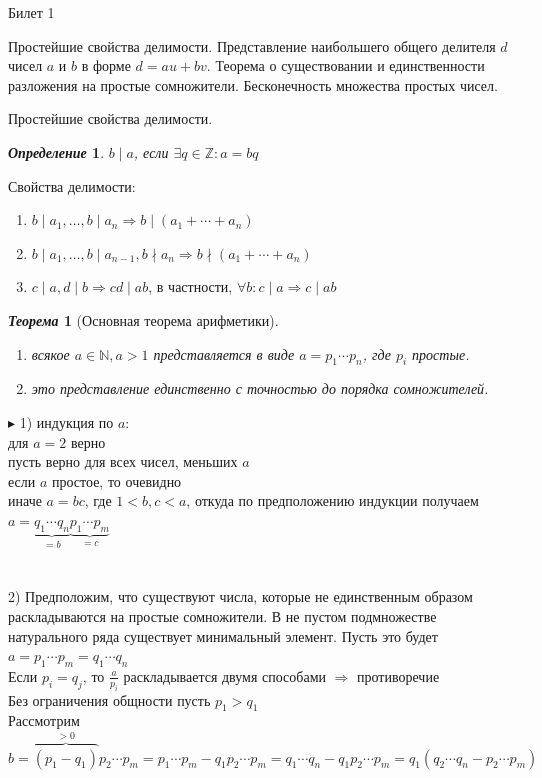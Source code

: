 \documentclass[a4paper,12pt]{article}
\newtheorem{deff}{\textit{Определение}}
\newtheorem{teo}{\textit{Теорема}}
\newcommand{\q}{\quad}
\newcommand{\pb}{\blacktriangleright}
\newcommand{\bb}[1]{\mathbb{#1}}
\begin{document}
\newpage
\begin{mybox}{\hypertarget{bil1}{Билет 1}}

\begin{formbox}{}
Простейшие свойства делимости. Представление наибольшего общего делителя $d$ чисел $a$ и $b$ в форме $d = au+bv$. Теорема о существовании и единственности разложения на простые сомножители. Бесконечность множества простых чисел.
\end{formbox}
Простейшие свойства делимости.
\begin{formbox}{}
\begin{deff} $b\mid a$, если $\exists q\in \mathbb{Z}: a=bq$
\end{deff}
\end{formbox}
Свойства делимости:
\begin{enumerate}
    \item $b\mid a_1, \dots, b\mid a_n \Rightarrow b\mid(a_1+\cdots+a_n)$
    \item $b\mid a_1, \dots, b\mid a_{n-1}, b\nmid a_n \Rightarrow b\nmid (a_1+\cdots+a_n)$
    \item $c\mid a, d\mid b \Rightarrow cd\mid ab$, в частности, $\forall b: c\mid a \Rightarrow c\mid ab$
\end{enumerate}

\begin{formbox}{}
\begin{teo}[Основная теорема арифметики]\q\\
\begin{enumerate}
    \item всякое $a \in \bb{N}, a > 1$ представляется в виде $a = p_1\cdots p_n$, где $p_i$ простые.
    \item это представление единственно с точностью до порядка сомножителей.
\end{enumerate}
\end{teo}
\end{formbox}
$\pb$ 1) индукция по $a$:\\
для $a = 2$ верно\\
пусть верно для всех чисел, меньших $a$\\
если $a$ простое, то очевидно\\
иначе $a = bc$, где $1<b,c<a$, откуда по предположению индукции получаем $a = \underbrace{q_1\cdots q_n}_{=b} \underbrace{p_1\cdots p_m}_{=c}$\\\q\\\q\\
2) Предположим, что существуют числа, которые не единственным образом раскладываются на простые сомножители. В не пустом подмножестве натурального ряда существует минимальный элемент. Пусть это будет $a = p_1\cdots p_m = q_1\cdots q_n$\\
Если $p_i = q_j$, то $\frac{a}{p_i}$ раскладывается двумя способами $\Rightarrow$ противоречие\\
Без ограничения общности пусть $p_1 > q_1$\\
Рассмотрим $b = \overbrace{(p_1 - q_1)}^{>0}p_2\cdots p_m = p_1\cdots p_m - q_1p_2\cdots p_m = q_1\cdots q_n - q_1 p_2\cdots p_m = q_1 (q_2 \cdots q_n - p_2\cdots p_m)$\\
\end{mybox}
\end{document}
